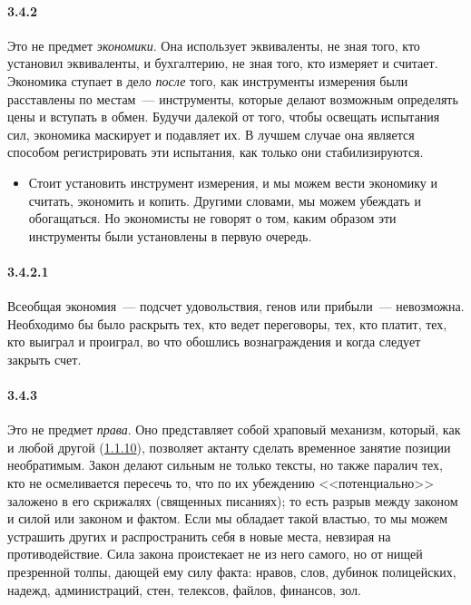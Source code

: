 \paragraph{3.4.2}\hypertarget{par:3.4.2}{} Это не предмет {\itshape экономики}. Она использует эквиваленты, не зная того, кто установил эквиваленты, и бухгалтерию, не зная того, кто измеряет и считает. Экономика ступает в дело {\itshape после} того, как инструменты измерения были расставлены по местам~--- инструменты, которые делают возможным определять цены и вступать в обмен. Будучи далекой от того, чтобы освещать испытания сил, экономика маскирует и подавляет их. В лучшем случае она является способом регистрировать эти испытания, как только они стабилизируются.
	\begin{itemize}
	\item 
	Стоит установить инструмент измерения, и мы можем вести экономику и считать, экономить и копить. Другими словами, мы можем убеждать и обогащаться. Но экономисты не говорят о том, каким образом эти инструменты были установлены в первую очередь.
	\end{itemize}

\paragraph{3.4.2.1}\hypertarget{par:3.4.2.1}{} Всеобщая экономия~--- подсчет удовольствия, генов или прибыли~--- невозможна. Необходимо бы было раскрыть тех, кто ведет переговоры, тех, кто платит, тех, кто выиграл и проиграл, во что обошлись вознаграждения и когда следует закрыть счет. 

\paragraph{3.4.3}\hypertarget{par:3.4.3}{} Это не предмет {\itshape права}. Оно представляет собой храповый механизм, который, как и любой другой (\hyperlink{par:1.1.10}{1.1.10}), позволяет актанту сделать временное занятие позиции необратимым. Закон делают сильным не только тексты, но также паралич тех, кто не осмеливается пересечь то, что по их убеждению <<потенциально>> заложено в его скрижалях (священных писаниях); то есть разрыв между законом и силой или законом и фактом. Если мы обладает такой властью, то мы можем устрашить других и распространить себя в новые места, невзирая на противодействие. Сила закона проистекает не из него самого, но от нищей презренной толпы, дающей ему силу факта: нравов, слов, дубинок полицейских, надежд, администраций, стен, телексов, файлов, финансов, зол.


